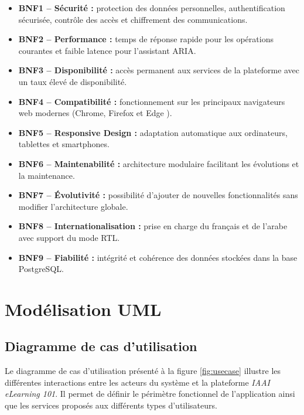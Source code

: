 \documentclass[12pt, a4paper]{report}
\begin{document}
\begin{itemize}
    \item \textbf{BNF1 -- Sécurité :}
    protection des données personnelles, authentification sécurisée,
    contrôle des accès et chiffrement des communications.

    \item \textbf{BNF2 -- Performance :}
    temps de réponse rapide pour les opérations courantes et faible
    latence pour l'assistant ARIA.

    \item \textbf{BNF3 -- Disponibilité :}
    accès permanent aux services de la plateforme avec un taux élevé
    de disponibilité.

    \item \textbf{BNF4 -- Compatibilité :}
    fonctionnement sur les principaux navigateurs web modernes
    (Chrome, Firefox et Edge ).

    \item \textbf{BNF5 -- Responsive Design :}
    adaptation automatique aux ordinateurs, tablettes et smartphones.

    \item \textbf{BNF6 -- Maintenabilité :}
    architecture modulaire facilitant les évolutions et la maintenance.

    \item \textbf{BNF7 -- Évolutivité :}
    possibilité d'ajouter de nouvelles fonctionnalités sans modifier
    l'architecture globale.

    \item \textbf{BNF8 -- Internationalisation :}
    prise en charge du français et de l'arabe avec support du mode RTL.

    \item \textbf{BNF9 -- Fiabilité :}
    intégrité et cohérence des données stockées dans la base PostgreSQL.
\end{itemize}
\section{Modélisation UML}
\subsection{Diagramme de cas d'utilisation}

Le diagramme de cas d'utilisation présenté à la figure \ref{fig:usecase}
illustre les différentes interactions entre les acteurs du système et la
plateforme \textit{IAAI eLearning 101}. Il permet de définir le périmètre
fonctionnel de l'application ainsi que les services proposés aux différents
types d'utilisateurs.
\end{document}
